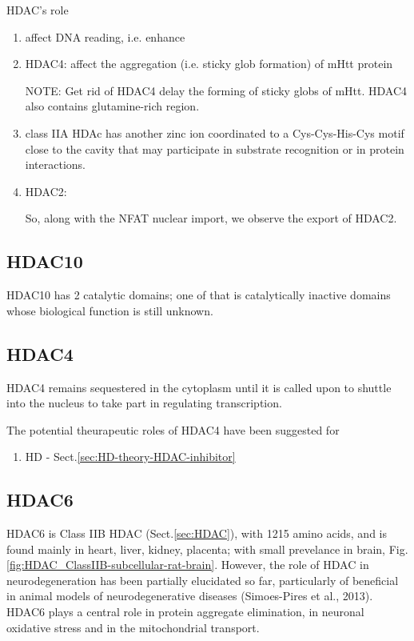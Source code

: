 HDAC's role
\begin{enumerate}
  \item affect DNA reading, i.e. enhance

  \item HDAC4: affect the aggregation (i.e. sticky glob formation) of mHtt
  protein

NOTE: Get rid of HDAC4   delay the forming of sticky globs of mHtt.
HDAC4 also contains glutamine-rich region.

  \item class IIA HDAc has another zinc ion coordinated to a
Cys-Cys-His-Cys motif close to the cavity that may participate in substrate
recognition or in protein interactions.
  
  \item HDAC2: 

So, along with the NFAT nuclear import, we observe the
export of HDAC2.
  
\end{enumerate}

\subsection{HDAC10}
\label{sec:HDAC10}

HDAC10 has 2 catalytic domains; one of that is catalytically inactive domains
whose biological function is still unknown.

\subsection{HDAC4}
\label{sec:HDAC4}

HDAC4 remains sequestered in the cytoplasm until it is called upon to shuttle
into the nucleus to take part in regulating transcription.

The potential theurapeutic roles of HDAC4 have been suggested for
\begin{enumerate}
  \item HD - Sect.\ref{sec:HD-theory-HDAC-inhibitor}
\end{enumerate}



\subsection{HDAC6}
\label{sec:HDAC6}

HDAC6 is Class IIB HDAC (Sect.\ref{sec:HDAC}), with 1215 amino acids, and is
found mainly in heart, liver, kidney, placenta; with small prevelance in brain,
Fig.\ref{fig:HDAC_ClassIIB-subcellular-rat-brain}.
However, the role of HDAC in neurodegeneration has been partially elucidated so
far, particularly of beneficial in animal models of neurodegenerative diseases
(Simoes-Pires et al., 2013).
HDAC6 plays a central role in protein aggregate elimination, in neuronal
oxidative stress and in the mitochondrial transport.

